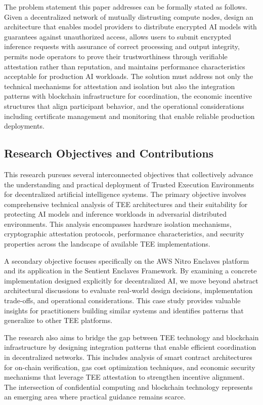 The problem statement this paper addresses can be formally stated as follows. Given a decentralized network of mutually distrusting compute nodes, design an architecture that enables model providers to distribute encrypted AI models with guarantees against unauthorized access, allows users to submit encrypted inference requests with assurance of correct processing and output integrity, permits node operators to prove their trustworthiness through verifiable attestation rather than reputation, and maintains performance characteristics acceptable for production AI workloads. The solution must address not only the technical mechanisms for attestation and isolation but also the integration patterns with blockchain infrastructure for coordination, the economic incentive structures that align participant behavior, and the operational considerations including certificate management and monitoring that enable reliable production deployments.

\subsection{Research Objectives and Contributions}

This research pursues several interconnected objectives that collectively advance the understanding and practical deployment of Trusted Execution Environments for decentralized artificial intelligence systems. The primary objective involves comprehensive technical analysis of TEE architectures and their suitability for protecting AI models and inference workloads in adversarial distributed environments. This analysis encompasses hardware isolation mechanisms, cryptographic attestation protocols, performance characteristics, and security properties across the landscape of available TEE implementations.

A secondary objective focuses specifically on the AWS Nitro Enclaves platform and its application in the Sentient Enclaves Framework. By examining a concrete implementation designed explicitly for decentralized AI, we move beyond abstract architectural discussions to evaluate real-world design decisions, implementation trade-offs, and operational considerations. This case study provides valuable insights for practitioners building similar systems and identifies patterns that generalize to other TEE platforms.

The research also aims to bridge the gap between TEE technology and blockchain infrastructure by designing integration patterns that enable efficient coordination in decentralized networks. This includes analysis of smart contract architectures for on-chain verification, gas cost optimization techniques, and economic security mechanisms that leverage TEE attestation to strengthen incentive alignment. The intersection of confidential computing and blockchain technology represents an emerging area where practical guidance remains scarce.

